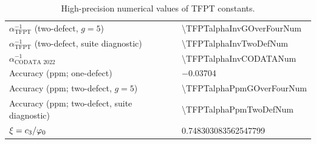 \begin{table}[H]
\begin{tabular}{@{}ll@{}}
$\alpha^{-1}_{\text{TFPT}}$ (two-defect, $g=5$) & \num[round-mode=places,round-precision=12]{\TFPTalphaInvGOverFourNum}\\
$\alpha^{-1}_{\text{TFPT}}$ (two-defect, suite diagnostic) & \num[round-mode=places,round-precision=12]{\TFPTalphaInvTwoDefNum}\\
$\alpha^{-1}_{\text{CODATA 2022}}$ & \num[round-mode=places,round-precision=9]{\TFPTalphaInvCODATANum}\\
Accuracy (ppm; one-defect) & \num[round-mode=places,round-precision=6]{-0.03704}\\
Accuracy (ppm; two-defect, $g=5$) & \num[round-mode=places,round-precision=6]{\TFPTalphaPpmGOverFourNum}\\
Accuracy (ppm; two-defect, suite diagnostic) & \num[round-mode=places,round-precision=6]{\TFPTalphaPpmTwoDefNum}\\
$\xi = c_3/\varphi_0$ & \num[round-mode=places,round-precision=9]{0.748303083562547799}\\
\bottomrule
\end{tabular}
\caption{High-precision numerical values of TFPT constants.}
\label{tab:constants}
\end{table}

